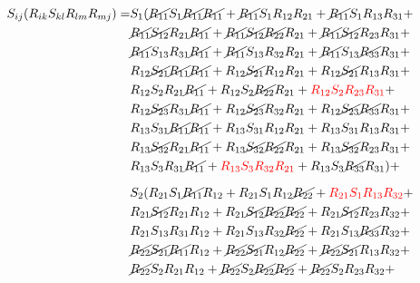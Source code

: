 \begin{equation}
    \begin{split}
        S_{ij}(R_{ik}S_{kl} R_{lm} R_{mj}) = &
            S_{1}(
            \cancel{R_{11}}S_{1}\cancel{R_{11}}\cancel{R_{11}} + \cancel{R_{11}}S_{1}R_{12}R_{21} + \cancel{R_{11}}S_{1}R_{13}R_{31}  +   \\
        &   \cancel{R_{11}}\cancel{S_{12}}R_{21}\cancel{R_{11}} + \cancel{R_{11}}\cancel{S_{12}}\cancel{R_{22}}R_{21} + \cancel{R_{11}}\cancel{S_{12}}R_{23}R_{31}  +   \\
        &   \cancel{R_{11}}S_{13}R_{31}\cancel{R_{11}} + \cancel{R_{11}}S_{13}R_{32}R_{21} + \cancel{R_{11}}S_{13}\cancel{R_{33}}R_{31}  +   \\
        &   R_{12}\cancel{S_{21}}\cancel{R_{11}}\cancel{R_{11}} + R_{12}\cancel{S_{21}}R_{12}R_{21} + R_{12}\cancel{S_{21}}R_{13}R_{31}  +   \\
        &   R_{12}S_{2}R_{21}\cancel{R_{11}} + R_{12}S_{2}\cancel{R_{22}}R_{21} + {\color{red}R_{12}S_{2}R_{23}R_{31}}  +   \\
        &   R_{12}\cancel{S_{23}}R_{31}\cancel{R_{11}} + R_{12}\cancel{S_{23}}R_{32}R_{21} + R_{12}\cancel{S_{23}}\cancel{R_{33}}R_{31}  +   \\
        &   R_{13}S_{31}\cancel{R_{11}}\cancel{R_{11}} + R_{13}S_{31}R_{12}R_{21} + R_{13}S_{31}R_{13}R_{31}  +   \\
        &   R_{13}\cancel{S_{32}}R_{21}\cancel{R_{11}} + R_{13}\cancel{S_{32}}\cancel{R_{22}}R_{21} + R_{13}\cancel{S_{32}}R_{23}R_{31}  +   \\
        &   R_{13}S_{3}R_{31}\cancel{R_{11}} + {\color{red}R_{13}S_{3}R_{32}R_{21}} + R_{13}S_{3}\cancel{R_{33}}R_{31} 
        )+ \\[6pt] 
        &   S_{2}(
            R_{21}S_{1}\cancel{R_{11}}R_{12} + R_{21}S_{1}R_{12}\cancel{R_{22}} + {\color{red}R_{21}S_{1}R_{13}R_{32}} +    \\
        &   R_{21}\cancel{S_{12}}R_{21}R_{12} + R_{21}\cancel{S_{12}}\cancel{R_{22}}\cancel{R_{22}} + R_{21}\cancel{S_{12}}R_{23}R_{32} +    \\
        &   R_{21}S_{13}R_{31}R_{12} + R_{21}S_{13}R_{32}\cancel{R_{22}} + R_{21}S_{13}\cancel{R_{33}}R_{32} +    \\
        &   \cancel{R_{22}}\cancel{S_{21}}\cancel{R_{11}}R_{12} + \cancel{R_{22}}\cancel{S_{21}}R_{12}\cancel{R_{22}} + \cancel{R_{22}}\cancel{S_{21}}R_{13}R_{32} +    \\
        &   \cancel{R_{22}}S_{2}R_{21}R_{12} + \cancel{R_{22}}S_{2}\cancel{R_{22}}\cancel{R_{22}} + \cancel{R_{22}}S_{2}R_{23}R_{32} +    \\

\end{split}
\end{equation}
